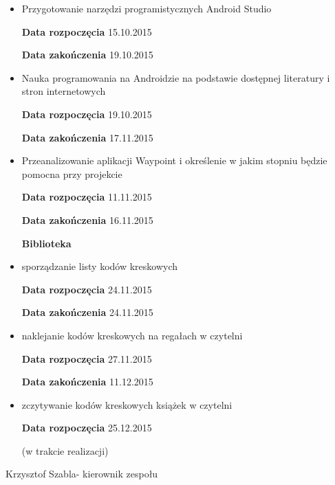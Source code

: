  \begin{itemize}
 \item Przygotowanie narzędzi programistycznych Android Studio
 
 \textbf{Data rozpoczęcia} 15.10.2015

\textbf{Data zakończenia} 19.10.2015

\item Nauka programowania na Androidzie na podstawie dostępnej literatury i stron internetowych

\textbf{Data rozpoczęcia} 19.10.2015

\textbf{Data zakończenia} 17.11.2015

\item Przeanalizowanie  aplikacji Waypoint i określenie w jakim stopniu będzie pomocna przy projekcie

\textbf{Data rozpoczęcia} 11.11.2015

\textbf{Data zakończenia} 16.11.2015


\textbf{Biblioteka}

\item sporządzanie listy kodów kreskowych

\textbf{Data rozpoczęcia} 24.11.2015

\textbf{Data zakończenia} 24.11.2015
\item naklejanie kodów kreskowych na regałach  w czytelni

\textbf{Data rozpoczęcia} 27.11.2015

\textbf{Data zakończenia} 11.12.2015

\item zczytywanie kodów kreskowych książek w czytelni

\textbf{Data rozpoczęcia} 25.12.2015

(w trakcie realizacji)
 \end{itemize}

Krzysztof Szabla- kierownik zespołu

